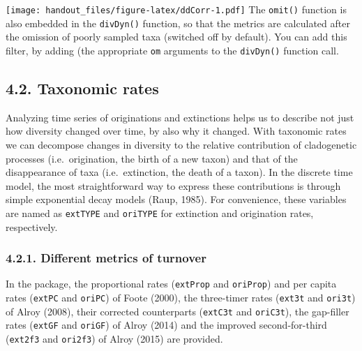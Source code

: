 \documentclass[]{article}
\begin{document}
\texttt{[image: handout\_files/figure-latex/ddCorr-1.pdf]} The
\texttt{omit()} function is also embedded in the \texttt{divDyn()}
function, so that the metrics are calculated after the omission of
poorly sampled taxa (switched off by default). You can add this filter,
by adding (the appropriate \texttt{om} arguments to the
\texttt{divDyn()} function call.

\hypertarget{taxonomic-rates}{%
\subsection{4.2. Taxonomic rates}\label{taxonomic-rates}}

Analyzing time series of originations and extinctions helps us to
describe not just how diversity changed over time, by also why it
changed. With taxonomic rates we can decompose changes in diversity to
the relative contribution of cladogenetic processes (i.e.~origination,
the birth of a new taxon) and that of the disappearance of taxa
(i.e.~extinction, the death of a taxon). In the discrete time model, the
most straightforward way to express these contributions is through
simple exponential decay models (Raup, 1985). For convenience, these
variables are named as \texttt{extTYPE} and \texttt{oriTYPE} for
extinction and origination rates, respectively.

\hypertarget{different-metrics-of-turnover}{%
\subsubsection{4.2.1. Different metrics of
turnover}\label{different-metrics-of-turnover}}

In the package, the proportional rates (\texttt{extProp} and
\texttt{oriProp}) and per capita rates (\texttt{extPC} and
\texttt{oriPC}) of Foote (2000), the three-timer rates (\texttt{ext3t}
and \texttt{ori3t}) of Alroy (2008), their corrected counterparts
(\texttt{extC3t} and \texttt{oriC3t}), the gap-filler rates
(\texttt{extGF} and \texttt{oriGF}) of Alroy (2014) and the improved
second-for-third (\texttt{ext2f3} and \texttt{ori2f3}) of Alroy (2015)
are provided.
\end{document}
